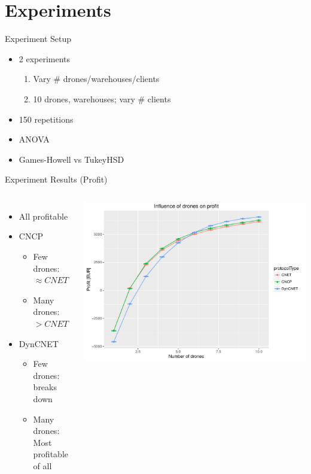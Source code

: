 \documentclass[notes]{beamer}
\begin{document}
	\section{Experiments}
	\begin{frame}{Experiment Setup}
		\begin{itemize}
			\item 2 experiments
				\begin{enumerate}
				\item Vary \# drones/warehouses/clients
				\item 10 drones, warehouses; vary \# clients
				\end{enumerate}
			\item 150 repetitions
			\item ANOVA
			\item Games-Howell vs TukeyHSD
		\end{itemize}
	\end{frame}
	\begin{frame}{Experiment Results (Profit)}
		\begin{columns}[c]
			\begin{itemize}
				\item All profitable
				\item CNCP
					\begin{itemize}
					\item Few drones: $\approx CNET$
					\item Many drones: $> CNET$
					\end{itemize}
				\item DynCNET
				\begin{itemize}
					\item Few drones: breaks down
					\item Many drones: Most profitable of all
				\end{itemize}
			\end{itemize}
			
			\includegraphics[width=\columnwidth]{drones-profit}
		\end{columns}
	\end{frame}
\end{document}
